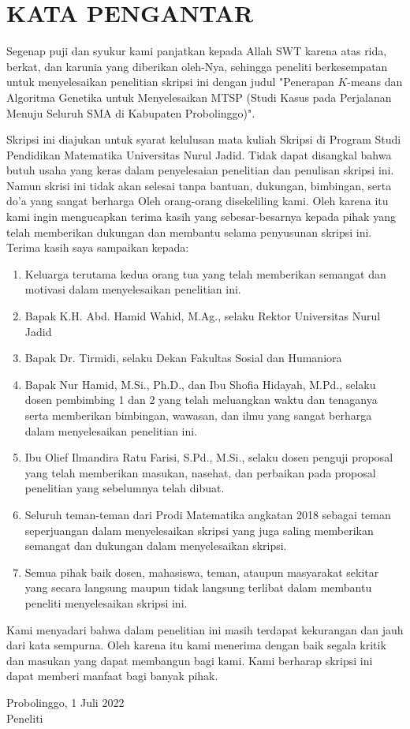 \newpage
\chapter*{KATA PENGANTAR}

Segenap puji dan syukur kami panjatkan kepada Allah SWT karena atas rida, berkat, dan karunia yang diberikan oleh-Nya, sehingga peneliti berkesempatan untuk menyelesaikan penelitian skripsi ini dengan judul "Penerapan $K$-means dan Algoritma Genetika untuk Menyelesaikan MTSP (Studi Kasus pada Perjalanan Menuju Seluruh SMA di Kabupaten Probolinggo)".

Skripsi ini diajukan untuk syarat kelulusan mata kuliah Skripsi di Program Studi Pendidikan Matematika Universitas Nurul Jadid. Tidak dapat disangkal bahwa butuh usaha yang keras dalam penyelesaian penelitian dan penulisan skripsi ini. Namun skrisi ini tidak akan selesai tanpa bantuan, dukungan, bimbingan, serta do'a yang sangat berharga Oleh orang-orang disekeliling kami. Oleh karena itu kami ingin mengucapkan terima kasih yang sebesar-besarnya kepada pihak yang telah memberikan dukungan dan membantu selama penyusunan skripsi ini. Terima kasih saya sampaikan kepada:

\begin{enumerate}
	\item Keluarga terutama kedua orang tua yang telah memberikan semangat dan motivasi dalam menyelesaikan penelitian ini.
	\item Bapak K.H. Abd. Hamid Wahid, M.Ag., selaku Rektor Universitas Nurul Jadid
	\item Bapak Dr. Tirmidi, selaku Dekan Fakultas Sosial dan Humaniora
	\item Bapak Nur Hamid, M.Si., Ph.D., dan Ibu Shofia Hidayah, M.Pd., selaku dosen pembimbing 1 dan 2 yang telah meluangkan waktu dan tenaganya serta memberikan bimbingan, wawasan, dan ilmu yang sangat berharga dalam menyelesaikan penelitian ini.
	\item Ibu Olief Ilmandira Ratu Farisi, S.Pd., M.Si., selaku dosen penguji proposal yang telah memberikan masukan, nasehat, dan perbaikan pada proposal penelitian yang sebelumnya telah dibuat.
	\item Seluruh teman-teman dari Prodi Matematika angkatan 2018 sebagai teman seperjuangan dalam menyelesaikan skripsi yang juga saling memberikan semangat dan dukungan dalam menyelesaikan skripsi.
	\item Semua pihak baik dosen, mahasiswa, teman, ataupun masyarakat sekitar yang secara langsung maupun tidak langsung terlibat dalam membantu peneliti menyelesaikan skripsi ini.
\end{enumerate}

Kami menyadari bahwa dalam penelitian ini masih terdapat kekurangan dan jauh dari kata sempurna. Oleh karena itu kami menerima dengan baik segala kritik dan masukan yang dapat membangun bagi kami. Kami berharap skripsi ini dapat memberi manfaat bagi banyak pihak.

\begin{flushright}
Probolinggo, 1 Juli 2022\\
Peneliti
\end{flushright}